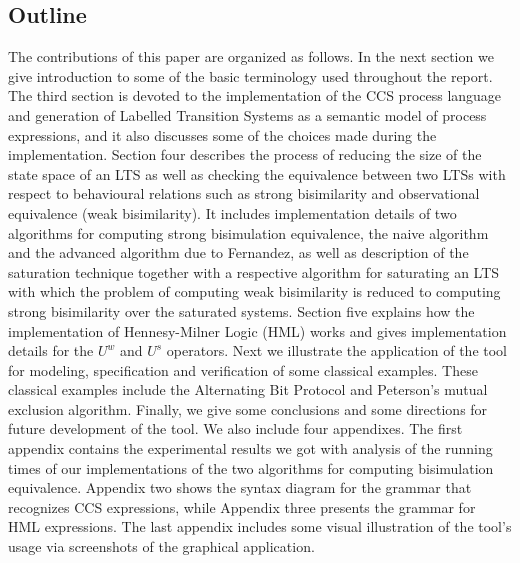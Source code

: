 \subsection{Outline} The contributions of this paper are organized as follows. In the next section we give introduction to some of the basic terminology used throughout the report. The third section is devoted to the implementation of the CCS process language and generation of Labelled Transition Systems as a semantic model of process expressions, and it also discusses some of the choices made during the implementation. Section four describes the process of reducing the size of the state space of an LTS as well as checking the equivalence between two LTSs with respect to behavioural relations such as strong bisimilarity and observational equivalence (weak bisimilarity). It includes implementation details of two algorithms for computing strong bisimulation equivalence, the naive algorithm and the advanced algorithm due to Fernandez, as well as description of the saturation technique together with a respective algorithm  for saturating an LTS with which the problem of computing weak bisimilarity is reduced to computing strong bisimilarity over the saturated systems. Section five explains how the implementation of Hennesy-Milner Logic (HML) works and gives implementation details for the $U^{w}$ and $U^{s}$ operators. Next we illustrate the application of the tool for modeling, specification and verification of some classical examples. These classical examples include the Alternating Bit Protocol and Peterson's mutual exclusion algorithm. Finally, we give some conclusions and some directions for future development of the tool. We also include four appendixes. The first appendix contains the experimental results we got with analysis of the running times of our implementations of the two algorithms for computing bisimulation equivalence. Appendix two shows the syntax diagram for the grammar that recognizes CCS expressions, while Appendix three presents the grammar for HML expressions. The last appendix includes some visual illustration of the tool's usage via screenshots of the graphical application.
